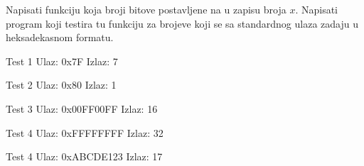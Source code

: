 \begin{Exercise}[label=202]
 Napisati funkciju koja broji bitove postavljene na  u zapisu broja $x$. Napisati program koji testira tu funkciju za brojeve koji se sa standardnog ulaza zadaju u heksadekasnom formatu.

\begin{minitest}
\begin{test}{Test 1}
Ulaz:   0x7F  
Izlaz:  7   
\end{test}
\end{minitest}
\begin{minitest}
\begin{test}{Test 2}
Ulaz:   0x80
Izlaz:  1
\end{test}
\end{minitest}
\begin{minitest}
\begin{test}{Test 3}
Ulaz:   0x00FF00FF
Izlaz:  16
\end{test}
\end{minitest}

\begin{minitest}
\begin{test}{Test 4}
Ulaz:   0xFFFFFFFF
Izlaz:  32
\end{test}
\end{minitest}
\begin{minitest}
\begin{test}{Test 4}
Ulaz:   0xABCDE123
Izlaz:  17
\end{test}
\end{minitest}
\end{Exercise}
\begin{Answer}[ref=202]
\end{Answer}


